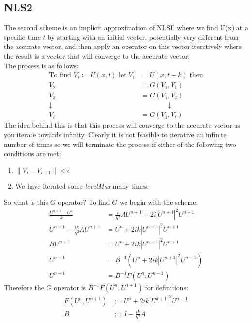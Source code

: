 \documentclass[11pt, oneside]{article}   	%
\begin{document}
\subsection{NLS2}
The second scheme is an implicit approximation of NLSE where we find U(x) at a specific time $t$ by starting with an initial vector, potentially very different from the accurate vector, and then apply an operator on this vector iteratively where the result is a vector that will converge to the accurate vector.\\
The process is as follows:
\begin{align*}
\text{To find }V_{\ell} := U(x,t) \text{ let }V_1 &= U(x,t-k)\text{ then}\\
V_2 &= G(V_1,V_1)\\
V_3 &= G(V_1,V_2)\\
\downarrow &\qquad \qquad \downarrow \\
V_{\ell} &= G(V_1, V_{\ell})
\end{align*}
The idea behind this is that this process will converge to the accurate vector as you iterate towards infinity. Clearly it is not feasible to iterative an infinite number of times so we will terminate the process if either of the following two conditions are met:
\begin{enumerate}
    \item $\lVert V_i - V_{i-1}\rVert < \epsilon$
    \item We have iterated some \textit{levelMax} many times.
\end{enumerate}
So what is this $G$ operator? To find $G$ we begin with the scheme:
\begin{align*}
    \frac{U^{n+1} - U^n}{k} &= \frac{i}{h^2}AU^{n+1} + 2i|U^{n+1}|^2U^{n+1}\\
    U^{n+1} - \frac{ik}{h^2}AU^{n+1} &= U^n + 2ik|U^{n+1}|^2U^{n+1}\\
    BU^{n+1} &= U^n + 2ik|U^{n+1}|^2U^{n+1}\\
    U^{n+1} &= B^{-1}(U^n + 2ik|U^{n+1}|^2U^{n+1})\\
    U^{n+1} &= B^{-1}F(U^n, U^{n+1})
\end{align*}
Therefore the $G$ operator is $B^{-1}F(U^n, U^{n+1})$ for definitions:
\begin{align*}
    F(U^n, U^{n+1}) &:= U^n + 2ik|U^{n+1}|^2U^{n+1}\\
    B &:= I - \frac{ik}{h^2}A
\end{align*}
\end{document}
